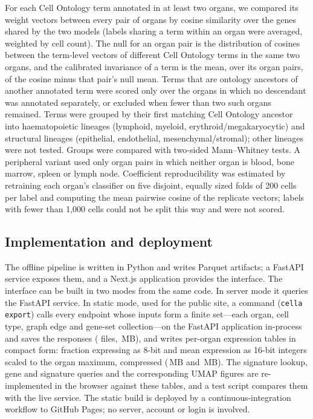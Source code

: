 \documentclass[11pt]{article}
\begin{document}
For each Cell Ontology term annotated in at least two organs, we compared its weight vectors between every pair of organs by cosine similarity over the genes shared by the two models (labels sharing a term within an organ were averaged, weighted by cell count). The null for an organ pair is the distribution of cosines between the term-level vectors of different Cell Ontology terms in the same two organs, and the calibrated invariance of a term is the mean, over its organ pairs, of the cosine minus that pair's null mean. Terms that are ontology ancestors of another annotated term were scored only over the organs in which no descendant was annotated separately, or excluded when fewer than two such organs remained. Terms were grouped by their first matching Cell Ontology ancestor into haematopoietic lineages (lymphoid, myeloid, erythroid/megakaryocytic) and structural lineages (epithelial, endothelial, mesenchymal/stromal); other lineages were not tested. Groups were compared with two-sided Mann--Whitney tests. A peripheral variant used only organ pairs in which neither organ is blood, bone marrow, spleen or lymph node. Coefficient reproducibility was estimated by retraining each organ's classifier on five disjoint, equally sized folds of 200 cells per label and computing the mean pairwise cosine of the replicate vectors; labels with fewer than 1{,}000 cells could not be split this way and were not scored.

\subsection{Implementation and deployment}

The offline pipeline is written in Python and writes Parquet artifacts; a FastAPI service exposes them, and a Next.js application provides the interface. The interface can be built in two modes from the same code. In server mode it queries the FastAPI service. In static mode, used for the public site, a command (\texttt{cella export}) calls every endpoint whose inputs form a finite set---each organ, cell type, graph edge and gene-set collection---on the FastAPI application in-process and saves the responses (\nExportFiles{} files, \exportJsonMB{}\,MB), and writes per-organ expression tables in compact form: fraction expressing as 8-bit and mean expression as 16-bit integers scaled to the organ maximum, compressed (\exportPctMB{}\,MB and \exportMeanMB{}\,MB). The signature lookup, gene and signature queries and the corresponding UMAP figures are re-implemented in the browser against these tables, and a test script compares them with the live service. The static build is deployed by a continuous-integration workflow to GitHub Pages; no server, account or login is involved.
\end{document}

